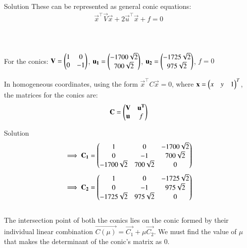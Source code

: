 \documentclass{beamer}
\begin{document}
\begin{frame}{Solution}
These can be represented as general conic equations:
\begin{align}
\vec{x}^\top\vec{V}\vec{x} + 2\vec{u}^\top\vec{x} + f = 0
\end{align}\\ \\ \\ 
For the conics: $\mathbf{V} = \begin{pmatrix}1 & 0 \\ 0 & -1\end{pmatrix}$, $\mathbf{u_1} = \begin{pmatrix}-1700\sqrt{2} \\ 700\sqrt{2}\end{pmatrix}$, $\mathbf{u_2} = \begin{pmatrix}-1725\sqrt{2} \\ 975\sqrt{2}\end{pmatrix}$, $f=0$

In homogeneous coordinates, using the form $\vec{x}^\top C \vec{x} = 0$, where $\mathbf{x} = \begin{pmatrix}x & y & 1\end{pmatrix}^T$, the matrices for the conics are:\\
\begin{align}
\mathbf{C} = \begin{pmatrix}\mathbf{V} & \mathbf{u^T} \\ \mathbf{u} & f\end{pmatrix}
\end{align}
  
\end{frame}

\begin{frame}{Solution}
\begin{align}
\implies \mathbf{C_1} = \begin{pmatrix}1 & 0 & -1700\sqrt{2} \\ 0 & -1 & 700\sqrt{2} \\ -1700\sqrt{2} & 700\sqrt{2} & 0\end{pmatrix}
\end{align}
\begin{align}
\implies \mathbf{C_2} = \begin{pmatrix}1 & 0 & -1725\sqrt{2} \\ 0 & -1 & 975\sqrt{2} \\ -1725\sqrt{2} & 975\sqrt{2} & 0\end{pmatrix}
\end{align}\\    
The intersection point of both the conics lies on the conic formed by their individual linear combination $\vec{C(\mu)} = \vec{C_1} + \mu\vec{C_2}$. We must find the value of $\mu$ that makes the determinant of the conic's matrix as 0.

\end{frame}
\end{document}
